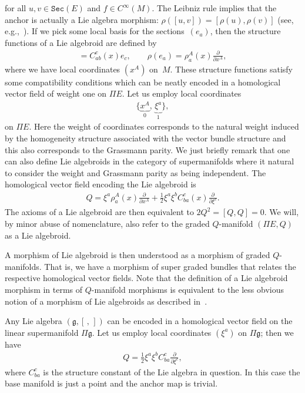 \documentclass[10pt,a4paper]{amsart}
\def\Sec{\mathtt{Sec}}
\numberwithin{equation}{section}
\begin{document}
\noindent for all $u,v \in \Sec(E)$ and $f \in C^{\infty}(M)$. The Leibniz rule implies that the anchor is actually a Lie algebra morphism: $\rho\left([u,v]\right) = [\rho(u), \rho(v)]$ (see, e.g.,~\cite{Grabowski:2003}). If we pick some local basis for the sections~$(e_{a})$, then the structure functions of a Lie algebroid are def\/ined by
\begin{gather*}
[e_{a} , e_{b}]  =  C_{ab}^{c}(x)e_{c}, \qquad
\nonumber \rho(e_{a})  =  \rho_{a}^{A}(x)\frac{\partial}{\partial x^{A}},
\end{gather*}
 where we have local coordinates $(x^{A})$ on~$M$. These structure functions satisfy some compatibility conditions which can be neatly encoded in a homological vector f\/ield of weight one on $\Pi E$. Let us employ local coordinates
\begin{gather*}
\big\{\underbrace{x^{A}}_{0}, \, \underbrace{\xi^{a}}_{1}\big\},
\end{gather*}
on $\Pi E$. Here the weight of coordinates corresponds to the natural weight induced by the homogeneity structure associated with the vector bundle structure \cite{Grabowski:2006} and this also corresponds to the Grassmann parity. We just brief\/ly remark that one can also def\/ine Lie algebroids in the category of supermanifolds where it natural to consider the weight and Grassmann parity as being independent. The homological vector f\/ield encoding the Lie algebroid is
\begin{gather*}
Q = \xi^{a}\rho_{a}^{A}(x) \frac{\partial}{\partial x^{A}} + \frac{1}{2}\xi^{a}\xi^{b}C_{ba}^{c}(x)\frac{\partial}{\partial \xi^{c}}.
\end{gather*}
The axioms of a Lie algebroid are then equivalent to $2Q^{2} = [Q,Q]=0$. We will, by minor abuse of nomenclature, also refer to the graded $Q$-manifold $(\Pi E, Q)$ as a  Lie algebroid.


A morphism of Lie algebroid is then understood as a morphism of graded $Q$-manifolds. That is, we have a morphism of super graded bundles that relates the respective homological vector f\/ields. Note that the def\/inition of a Lie algebroid morphism in terms of $Q$-manifold morphisms  is  equivalent to the less obvious notion of a morphism of Lie algebroids as described in~\cite{Mackenzie2005}.



\begin{Example}
Any Lie algebra $(\mathfrak{g}, [\,,\,])$ can be encoded in a homological vector f\/ield on the linear supermanifold $\Pi \mathfrak{g}$. Let us employ local coordinates $(\xi^{a})$ on $\Pi \mathfrak{g}$; then we have
\begin{gather*}
Q = \frac{1}{2}\xi^{a}\xi^{b}C_{ba}^{c} \frac{\partial}{\partial \xi^{c}},
\end{gather*}
\noindent where $C_{ba}^{c}$ is the structure constant of the Lie algebra in question.
In this case the base manifold is just a point and the anchor map is trivial.
\end{Example}
\end{document}
